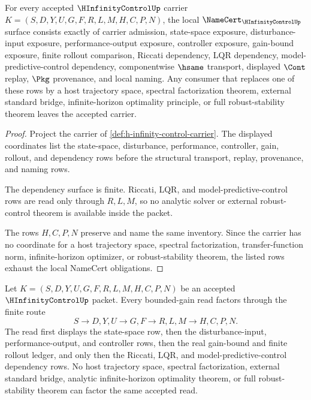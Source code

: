 \begin{theorem}
\label{thm:h-infinity-control-namecert-obligations}
For every accepted $\HInfinityControlUp$ carrier $K=(S,D,Y,U,G,F,R,L,M,H,C,P,N)$, the local $\NameCert_{\HInfinityControlUp}$ surface consists exactly of carrier admission, state-space exposure, disturbance-input exposure, performance-output exposure, controller exposure, gain-bound exposure, finite rollout comparison, Riccati dependency, LQR dependency, model-predictive-control dependency, componentwise $\hsame$ transport, displayed $\Cont$ replay, $\Pkg$ provenance, and local naming. Any consumer that replaces one of these rows by a host trajectory space, spectral factorization theorem, external standard bridge, infinite-horizon optimality principle, or full robust-stability theorem leaves the accepted carrier.
\end{theorem}

\begin{proof}
Project the carrier of \autoref{def:h-infinity-control-carrier}. The displayed coordinates list the state-space, disturbance, performance, controller, gain, rollout, and dependency rows before the structural transport, replay, provenance, and naming rows.

The dependency surface is finite. Riccati, LQR, and model-predictive-control rows are read only through $R,L,M$, so no analytic solver or external robust-control theorem is available inside the packet.

The rows $H,C,P,N$ preserve and name the same inventory. Since the carrier has no coordinate for a host trajectory space, spectral factorization, transfer-function norm, infinite-horizon optimizer, or robust-stability theorem, the listed rows exhaust the local NameCert obligations.
\end{proof}

\begin{theorem}
\label{thm:h-infinity-control-bounded-gain-route}
Let $K=(S,D,Y,U,G,F,R,L,M,H,C,P,N)$ be an accepted $\HInfinityControlUp$ packet. Every bounded-gain read factors through the finite route
$$
S \longrightarrow D,Y,U \longrightarrow G,F \longrightarrow R,L,M \longrightarrow H,C,P,N .
$$
The read first displays the state-space row, then the disturbance-input, performance-output, and controller rows, then the real gain-bound and finite rollout ledger, and only then the Riccati, LQR, and model-predictive-control dependency rows. No host trajectory space, spectral factorization, external standard bridge, analytic infinite-horizon optimality theorem, or full robust-stability theorem can factor the same accepted read.
\end{theorem}

